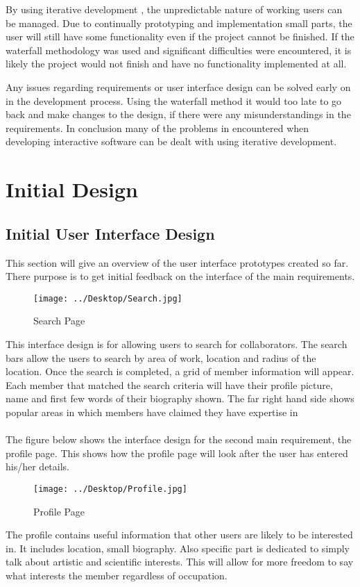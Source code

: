 \documentclass[a4paper,oneside,11pt]{report}
\begin{document}
By using iterative development , the unpredictable nature of working users can be managed. Due to continually prototyping and implementation small parts, the user will still have some functionality even if the project cannot be finished. If the waterfall methodology was used and significant difficulties were encountered, it is likely the project would not finish and have no functionality implemented at all. 

Any issues regarding requirements or user interface design can be solved early on in the development process. Using the waterfall method it would too late to go back and make changes to the design, if there were any misunderstandings in the requirements.
In conclusion many of the problems in encountered when developing interactive software can be dealt with using iterative development. 

\chapter{Initial Design}
\section{Initial User Interface Design}
This section will give an overview of the user interface prototypes created so far. There purpose is to get initial feedback on the interface of the main requirements.

\begin{figure}[!ht]
\centering
\texttt{[image: ../Desktop/Search.jpg]}
\caption{Search Page}
\end{figure}
This interface design is for allowing users to search for collaborators. The search bars allow the users to search by area of work, location and radius of the location.
Once the search is completed, a grid of member information will appear. Each member that matched the search criteria will have their profile picture, name and first few words of their biography shown. The far right hand side shows popular areas in which members have claimed they have expertise in
\\
\\
The figure below shows the interface design for the second main requirement, the profile page. This shows how the profile page will look after the user has entered his/her details.

\begin{figure}[!ht]
\centering
\texttt{[image: ../Desktop/Profile.jpg]}
\caption{Profile Page}
\end{figure}
The profile contains useful information that other users are likely to be interested in. It includes location, small biography. Also specific part is dedicated to simply talk about artistic and scientific interests. This will allow for more freedom to say what interests the member regardless of occupation.
\end{document}
